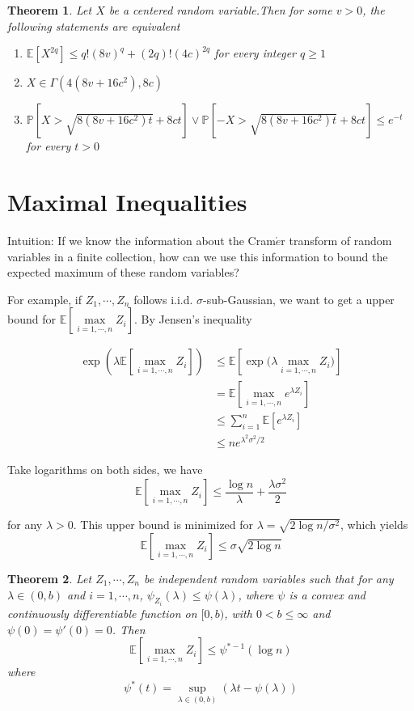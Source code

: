 \documentclass[10pt]{article}
\newcounter{lecnum}
\newtheorem{theorem}{Theorem}[lecnum]
\newcommand{\Expect}[1]{\mathbb{E}\!\left[#1\right]}
\renewcommand{\P}[1]{\mathbb{P}\!\left[#1\right]}
\begin{document}
\begin{theorem}
Let $X$ be a centered random variable.Then for some $v > 0$,
the following statements are equivalent
\begin{enumerate}
\item $\Expect{X^{2q}} \le q ! (8v)^q + (2 q )! (4c)^{2q}$ \quad for every integer $q \ge 1$
\item $X \in \Gamma(4(8v + 16c^2), 8c)$
\item $\P{ X > \sqrt{8(8v + 16c^2)t} +8ct }  \lor \P{  -X > \sqrt{8(8v + 16c^2)t} +8ct } \le e^{-t}$ \quad 
for every $t > 0$
\end{enumerate}
\end{theorem}

\section{Maximal Inequalities}
Intuition: If we know the information about the Cram$\acute{e}$r transform of random variables in a finite collection,
how can we use this information to bound the expected maximum of these random variables?

For example, if $Z_1, \cdots, Z_n$ follows i.i.d. $\sigma$-sub-Gaussian, 
we want to get a upper bound for $\Expect{\max\limits_{i=1, \cdots, n}Z_i}$. By Jensen's inequality

\begin{align}
\exp{(\lambda \Expect{\max\limits_{i=1, \cdots, n}Z_i})} & \le \Expect{\exp{(\lambda \max\limits_{i=1, \cdots, n}Z_i})} \\
& = \Expect{\max\limits_{i=1, \cdots, n} e^{\lambda Z_i}} \\
& \le \sum_{i=1}^n \Expect{e^{\lambda Z_i}} \\
& \le n e^{\lambda^2 \sigma^2 /2}
\end{align}

Take logarithms on both sides, we have
\begin{equation}
\Expect{\max\limits_{i=1, \cdots, n}Z_i} \le \frac{\log{n}}{\lambda} + \frac{\lambda \sigma^2}{2}
\end{equation}

for any $\lambda > 0$. This upper bound is minimized for $\lambda = \sqrt{2 \log{n} / \sigma^2}$,
which yields
\begin{equation}
\Expect{\max\limits_{i=1, \cdots, n}Z_i} \le  \sigma \sqrt{2 \log{n}}
\end{equation}

\begin{theorem}
Let $Z_1, \cdots, Z_n$ be independent random variables such that for any $\lambda \in (0, b)$ and 
$i = 1, \cdots, n$, $\psi_{Z_{i}}(\lambda) \le \psi(\lambda)$, where $\psi$ is a convex and continuously differentiable function on $[0, b)$, with $0 < b \le \infty$ and $\psi(0) = \psi'(0)=0$. Then
\begin{equation}
\Expect{\max\limits_{i=1, \cdots, n}Z_i} \le \psi^{*-1}(\log{n})
\end{equation}
where
\begin{equation}
\psi^{*}(t) = \sup\limits_{\lambda \in (0, b)} (\lambda t - \psi(\lambda))
\end{equation}
\end{theorem}
\end{document}
